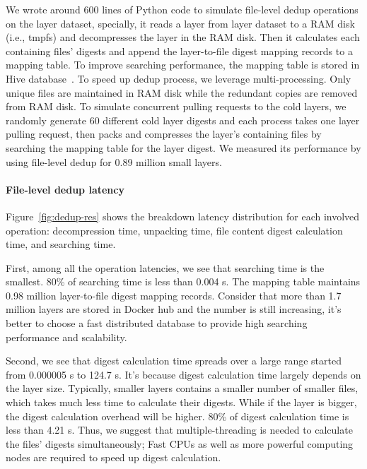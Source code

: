 We wrote around 600 lines of Python code to simulate file-level dedup operations on the layer dataset, specially, it reads a layer from layer dataset to a RAM disk (i.e., tmpfs) and decompresses the layer in the RAM disk. Then it calculates each containing files' digests and append the layer-to-file digest mapping records to a mapping table.
To improve searching performance, the mapping table is stored in Hive database~\cite{xxx}.
%
%
To speed up dedup process, we leverage multi-processing. Only unique files are maintained in RAM disk while the redundant copies are removed from RAM disk. To simulate concurrent pulling requests to the cold layers, we randomly generate 60 different cold layer digests and each process takes one layer pulling request, then packs and compresses the layer's containing files by searching the mapping table for the layer digest. We measured its performance by using file-level dedup for 0.89 million small layers.
%


\paragraph{File-level dedup latency}

%
Figure~\ref{fig:dedup-res} shows the breakdown latency distribution for each involved operation: decompression time, unpacking time, file content digest calculation time, and searching time.

First, among all the operation latencies, we see that searching time is the smallest. 80\% of searching time is less than 0.004 s. The mapping table maintains 0.98 million layer-to-file digest mapping records. Consider that more than 1.7 million layers are stored in Docker hub and the number is still increasing, it's better to choose a fast distributed database to provide high searching performance and scalability.
%
  
Second, we see that digest calculation time spreads over a large range started from 0.000005 s to 124.7 s. It's because digest calculation time
largely depends on the layer size. Typically, smaller layers contains a smaller number of smaller files, which takes much less time to
calculate their digests. While if the layer is bigger, the digest calculation overhead will be higher. 80\% of digest calculation time is
less than 4.21 s. 
Thus, we suggest that multiple-threading is needed to calculate the files' digests simultaneously; Fast CPUs as well as more powerful computing nodes
are required to speed up digest calculation.

